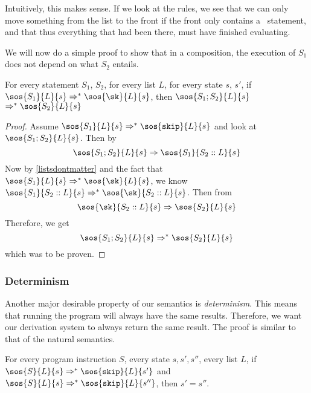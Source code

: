 Intuitively, this makes sense. If we look at the rules, we see that we can only move something from the list to the front if the front only contains a \sk ~statement, and that thus everything that had been there, must have finished evaluating. 

We will now do a simple proof to show that in a composition, the execution of $S_1$ does not depend on what $S_2$ entails. 

\begin{proposition}
For every statement $S_1$, $S_2$, for every list $L$, for every state $s$, $s'$, if $\sos{S_1}{L}{s} \Rightarrow ^{*} \sos{\sk}{L}{s}$, then $\sos{S_1;S_2}{L}{s}$ $\Rightarrow ^{*} \sos{S_2}{L}{s}$
\end{proposition}

\begin{proof}
Assume $\sos{S_1}{L}{s} \Rightarrow ^{*} \sos{\texttt{skip}}{L}{s}$ and look at $\sos{S_1;S_2}{L}{s}$. Then by \compsos
$$\sos{S_1;S_2}{L}{s} \Rightarrow  \sos{S_1}{S_2::L}{s}$$
Now by \ref{listsdontmatter} and the fact that $\sos{S_1}{L}{s} \Rightarrow ^{*} \sos{\sk}{L}{s}$, we know $\sos{S_1}{S_2::L}{s} \Rightarrow ^{*} \sos{\sk}{S_2::L}{s}$. Then from \loadsos
$$\sos{\sk}{S_2::L}{s} \Rightarrow \sos{S_2}{L}{s}$$
Therefore, we get
$$\sos{S_1;S_2}{L}{s} \Rightarrow ^{*} \sos{S_2}{L}{s}$$
which was to be proven.
\end{proof}


\subsubsection*{Determinism}
Another major desirable property of our semantics is \emph{determinism}. This means that running the program will always have the same results. Therefore, we want our derivation system to always return the same result. The proof is similar to that of the natural semantics.

\begin{theorem}
For every program instruction $S$, every state $s, s', s''$, every list $L$, if $\sos{S}{L}{s} \Rightarrow ^{*} \sos{\texttt{skip}}{L}{s'}$ and $\sos{S}{L}{s} \Rightarrow ^{*} \sos{\texttt{skip}}{L}{s''}$, then $s' = s''$.
\end{theorem}

